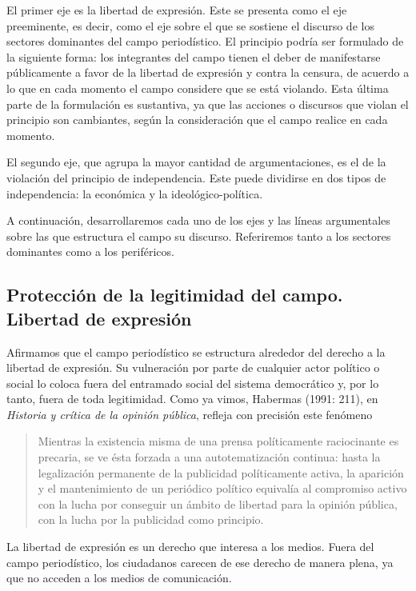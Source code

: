 El primer eje es la libertad de expresión. Este se presenta como el eje preeminente, es decir, como el eje sobre el que se sostiene el discurso de los sectores dominantes del campo periodístico. El principio podría ser formulado de la siguiente forma: los integrantes del campo tienen el deber de manifestarse públicamente a favor de la libertad de expresión y contra la censura, de acuerdo a lo que en cada momento el campo considere que se está violando. Esta última parte de la formulación es sustantiva, ya que las acciones o discursos que violan el principio son cambiantes, según la consideración que el campo realice en cada momento.

El segundo eje, que agrupa la mayor cantidad de argumentaciones, es el de la violación del principio de independencia. Este puede dividirse en dos tipos de independencia: la económica y la ideológico-política.

A continuación, desarrollaremos cada uno de los ejes y las líneas argumentales sobre las que estructura el campo su discurso. Referiremos tanto a los sectores dominantes como a los periféricos.

\subsection{Protección de la legitimidad del campo. Libertad de expresión}

Afirmamos que el campo periodístico se estructura alrededor del derecho a la libertad de expresión. Su vulneración por parte de cualquier actor político o social lo coloca fuera del entramado social del sistema democrático y, por lo tanto, fuera de toda legitimidad. Como ya vimos, Habermas (1991: 211), en \emph{Historia y crítica de la opinión pública}, refleja con precisión este fenómeno

\begin{quote}
Mientras la existencia misma de una prensa políticamente raciocinante es precaria, se ve ésta forzada a una autotematización continua: hasta la legalización permanente de la publicidad políticamente activa, la aparición y el mantenimiento de un periódico político equivalía al compromiso activo con la lucha por conseguir un ámbito de libertad para la opinión pública, con la lucha por la publicidad como principio.
\end{quote}

La libertad de expresión es un derecho que interesa a los medios. Fuera del campo periodístico, los ciudadanos carecen de ese derecho de manera plena, ya que no acceden a los medios de comunicación.

